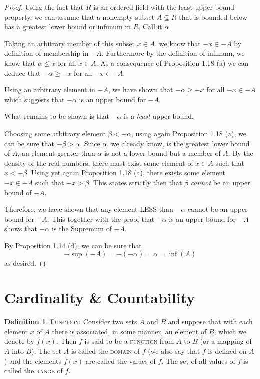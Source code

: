 \documentclass{tufte-book}
\theoremstyle{definition}
\newtheorem{definition}{Definition}[chapter]
\numberwithin{section}{chapter}
\begin{document}
\begin{proof}
Using the fact that $R$ is an ordered field with the least upper bound property, we can assume that a nonempty subset $A \subseteq R$ that is bounded below has a greatest lower bound or infimum in $R$.  Call it $\alpha$.

Taking an arbitrary member of this subset $x \in A$, we know that $-x \in -A$ by definition of membership in $-A$.  Furthermore by the definition of infimum, we know that $\alpha \leq x$ for all $x\in A$.  As a consequence of Proposition 1.18 (a) we can deduce that $-\alpha \geq -x$ for all $-x \in -A$.

Using an arbitrary element in $-A$, we have shown that $-\alpha \geq -x$ for all $-x \in -A$ which suggests that $-\alpha$ is an upper bound for $-A$.  

What remains to be shown is that $-\alpha$ is a \emph{least} upper bound.  

Choosing some arbitrary element $\beta < -\alpha$, using again Proposition 1.18 (a), we can be sure that $-\beta > \alpha$.  Since $\alpha $, we already know, is the greatest lower bound of $A$, an element greater than $\alpha$ is not a lower bound but a member of $A$.  By the density of the real numbers, there must exist some element of $x \in A$ such that  $x < -\beta$.  Using yet again Proposition 1.18 (a), there exists some element $-x \in -A$ such that $-x > \beta$.  This states strictly then that $\beta$ \emph{cannot} be an upper bound of $-A$.

Therefore, we have shown that any element LESS than $-\alpha$ cannot be an upper bound for $-A$.  This together with the proof that $-\alpha$ is an upper bound for $-A$ shows that $-\alpha$ is the Supremum of $-A$.


By Proposition 1.14 (d), we can be sure that 
$$ -\sup(-A) = -(-\alpha) = \alpha =  \inf(A) $$
as desired.
\end{proof}



\section{Cardinality \& Countability}
\begin{definition}\textsc{Function:}  Consider two sets $A$ and $B$ and suppose that with each element $x$ of $A$ there is associated, in some manner, an element of $B$, which we denote by $f(x)$.  Then $f$ is said to be a \textsc{function} from $A$ to $B$ (or a mapping of $A$ into $B$).  The set $A$ is called the \textsc{domain} of $f$  (we also say that $f$ is defined on $A$) and the elements $f(x)$ are called the values of $f$. The set of all values of $f$ is called the \textsc{range} of $f$.\end{definition}
\bigskip
\end{document}
